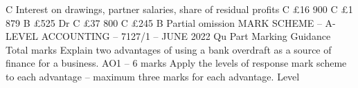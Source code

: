 \documentclass{article}
\begin{document}
C \newline
Interest on drawings, partner salaries, share of residual profits  \newline
C \newline
£16 900  \newline
C \newline
£1 879  \newline
B \newline
£525 Dr  \newline
C \newline
£37 800  \newline
C \newline
£245  \newline
B \newline
Partial omission \newline
  \newline
 \newline
 \newline
MARK SCHEME – A-LEVEL ACCOUNTING – 7127/1 – JUNE 2022  \newline
Qu \newline
Part \newline
Marking Guidance \newline
Total \newline
marks  \newline
 \newline
Explain two advantages of using a bank overdraft as a source of finance for a \newline
business.  \newline
 \newline
AO1 – 6 marks \newline
 \newline
Apply the levels of response mark scheme to each advantage – maximum three marks for each \newline
advantage. \newline
 \newline
Level \newline
\end{document}

